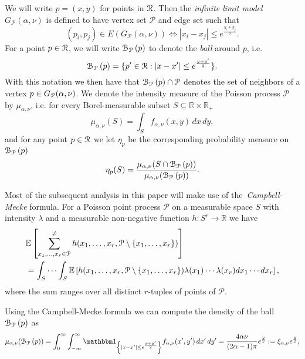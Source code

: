 We will write $p = (x, y)$ for points in ${\mathcal R}$. Then the \emph{infinite limit model} $G_{\mathcal{P}}(\alpha, \nu)$ is defined to have vertex set $\mathcal{P}$ and edge set such that
\[
	(p_i, p_j) \in E(G_{\mathcal{P}}(\alpha, \nu)) \iff |x_i - x_j| \leq e^{\frac{y_i + y_j}{2}}.
\]
For a point $p \in {\mathcal R}$, we will write ${\mathcal B}_{{\mathcal P}}\left(p\right)$ to denote the \emph{ball} around $p$, i.e.
\begin{equation}\label{eq:def_ball_P}
	{\mathcal B}_{{\mathcal P}}\left(p\right) = \{p^\prime \in {\mathcal R} : |x - x^\prime| \leq e^{\frac{y + y^\prime}{2}}\}.
\end{equation}
With this notation we then have that ${\mathcal B}_{{\mathcal P}}\left(p\right) \cap \mathcal{P}$ denotes the set of neighbors of a vertex $p \in G_{{\mathcal P}}(\alpha,\nu)$.  We denote the intensity measure of the Poisson process $\mathcal{P}$ by $\mu_{\alpha, \nu}$, i.e. for every Borel-measurable subset $S \subseteq \mathbb{R} \times \mathbb{R}_+$
\begin{equation}\label{eq:def_mu_P}
	\mu_{\alpha,\nu}(S) = \int_S f_{\alpha,\nu}(x,y) \, dx \, dy,
\end{equation}
and for any point $p \in {\mathcal R}$ we let $\eta_p$ be the corresponding probability measure on ${\mathcal B}_{{\mathcal P}}\left(p\right)$ 
\begin{equation}\label{eq:def_etq_P}
	\eta_p(S) = \frac{\mu_{\alpha,\nu}(S \cap {\mathcal B}_{{\mathcal P}}\left(p\right))}{\mu_{\alpha,\nu}({\mathcal B}_{{\mathcal P}}\left(p\right))}.
\end{equation}

Most of the subsequent analysis in this paper will make use of the~\emph{Campbell-Mecke} formula. 
For a Poisson point process $\mathcal{P}$ on a measurable space $S$ with intensity $\lambda$ and a measurable non-negative function $h: S^r \rightarrow \mathbb{R}$ we have
\begin{equation}\label{eq:def_Campbell-Mecke}
\begin{split}
& \mathbb{E}\left[\sum_{x_1,\ldots, x_r \in \mathcal{P}}^{\neq} h (x_1, \ldots, x_r,
\mathcal{P} \setminus \{x_1,\ldots, x_r\}) \right]\\
& = \int_S \cdots \int_S
\mathbb{E}\left[h(x_1,\ldots, x_r,\mathcal{P} \setminus \{x_1,\ldots, x_r\}) \lambda (x_1) \cdots \lambda (x_r) dx_1 \cdots dx_r\right],
\end{split}
\end{equation}
where the sum ranges over all distinct $r$-tuples of points of $\mathcal{P}$.

Using the Campbell-Mecke formula we can compute the density of the ball ${\mathcal B}_{{\mathcal P}}\left(p\right)$ as
\begin{equation}\label{eq:mu_ball_y_P}
	\mu_{\alpha, \nu}(\BallPo{p}) = \int_0^\infty \int_{-\infty}^\infty \ind{|x-x^\prime| \le e^{\frac{y + y^\prime}{2}}}
	f_{\alpha,\nu}(x^\prime, y^\prime) \, dx^\prime \, dy^\prime 
	= \frac{4\alpha \nu}{(2\alpha - 1)\pi} e^{\frac{y}{2}} := \xi_{\alpha,\nu}e^{\frac{y}{2}},
\end{equation}

